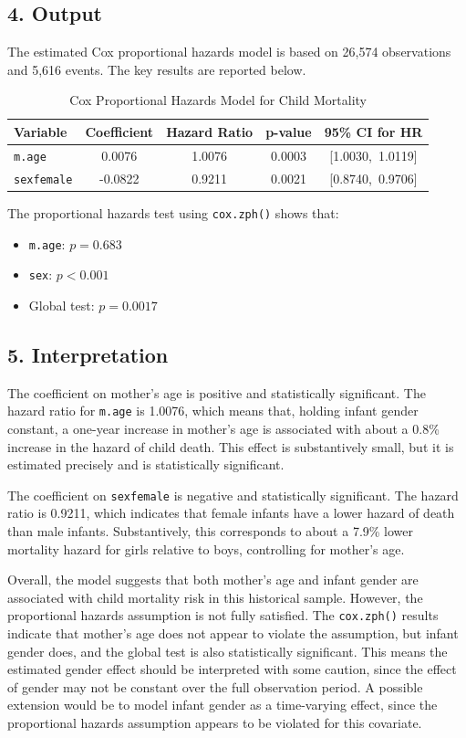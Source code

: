\documentclass[12pt,letterpaper]{article}
\begin{document}
	\subsection*{4. Output}
	
	The estimated Cox proportional hazards model is based on 26,574 observations and 5,616 events. The key results are reported below.
	
	\begin{table}[H]
		\centering
		\caption{Cox Proportional Hazards Model for Child Mortality}
		\begin{tabular}{lcccc}
			\toprule
			Variable & Coefficient & Hazard Ratio & p-value & 95\% CI for HR \\
			\midrule
			\texttt{m.age}      & 0.0076  & 1.0076 & 0.0003 & [1.0030,\ 1.0119] \\
			\texttt{sexfemale}  & -0.0822 & 0.9211 & 0.0021 & [0.8740,\ 0.9706] \\
			\bottomrule
		\end{tabular}
	\end{table}
	
	The proportional hazards test using \texttt{cox.zph()} shows that:
	\begin{itemize}
		\item \texttt{m.age}: $p = 0.683$
		\item \texttt{sex}: $p < 0.001$
		\item Global test: $p = 0.0017$
	\end{itemize}
	
	\subsection*{5. Interpretation}
	
	The coefficient on mother's age is positive and statistically significant. The hazard ratio for \texttt{m.age} is 1.0076, which means that, holding infant gender constant, a one-year increase in mother's age is associated with about a 0.8\% increase in the hazard of child death. This effect is substantively small, but it is estimated precisely and is statistically significant.
	
	The coefficient on \texttt{sexfemale} is negative and statistically significant. The hazard ratio is 0.9211, which indicates that female infants have a lower hazard of death than male infants. Substantively, this corresponds to about a 7.9\% lower mortality hazard for girls relative to boys, controlling for mother's age.
	
	Overall, the model suggests that both mother's age and infant gender are associated with child mortality risk in this historical sample. However, the proportional hazards assumption is not fully satisfied. The \texttt{cox.zph()} results indicate that mother's age does not appear to violate the assumption, but infant gender does, and the global test is also statistically significant. This means the estimated gender effect should be interpreted with some caution, since the effect of gender may not be constant over the full observation period. A possible extension would be to model infant gender as a time-varying effect, since the proportional hazards assumption appears to be violated for this covariate.
	
\end{document}
